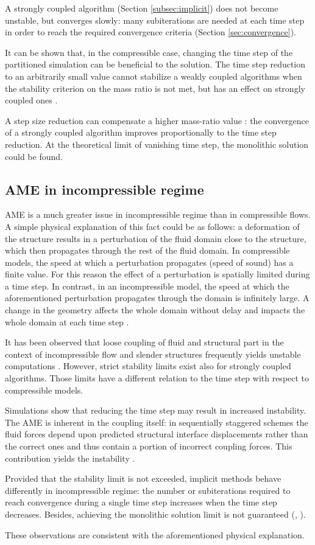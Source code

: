 A strongly coupled algorithm (Section \ref{subsec:implicit}) does not become unstable, but converges slowly: many subiterations are needed at each time step in order to reach the required convergence criteria (Section \ref{sec:convergence}).

It can be shown that, in the compressible case, changing the time step of the partitioned simulation can be beneficial to the solution. The time step reduction to an arbitrarily small value cannot stabilize a weakly coupled algorithms when the stability criterion on the mass ratio is not met, but has an effect on strongly coupled ones \cite{van2009added}.  

A step size reduction can compensate a higher mass-ratio value \cite{forster2006artificial}:
the convergence of a strongly coupled algorithm improves proportionally to the time step reduction. At the theoretical limit of vanishing time step, the monolithic solution could be found. 


\subsection{AME in incompressible regime}

AME is a much greater issue in incompressible regime than in compressible flows. A simple physical explanation of this fact could be as follows: a deformation of the structure results in a perturbation of the fluid domain close to the structure, which then propagates through the rest of the fluid domain. In compressible models, the speed at which a perturbation propagates (speed of sound) has a finite value. For this reason the effect of a perturbation is spatially limited during a time step. In contrast, in an incompressible model, the speed at which the aforementioned perturbation propagates through the domain is infinitely large. A change in the geometry affects the whole domain without delay and impacts the whole domain at each time step \cite{causin2005added}.

It has been observed that loose coupling of fluid and structural part in the context of incompressible flow and slender structures frequently yields unstable computations \cite{forster2006artificial}. However, strict stability limits exist also for strongly coupled algorithms. Those limits have a different relation to the time step with respect to compressible models.

Simulations show that reducing the time step may result in increased instability. The AME is inherent in the coupling itself: in sequentially staggered schemes the fluid forces depend upon predicted structural
interface displacements rather than the correct ones and thus contain a portion of incorrect coupling forces. This contribution yields the instability \cite{degroote2008stability}.

Provided that the stability limit is not exceeded, implicit methods behave differently in incompressible regime: the number or subiterations required to reach convergence during a single time step increases when the time step decreases. Besides, achieving the monolithic solution limit is not guaranteed (\cite{forster2006artificial}, \cite{van2009added}).

These observations are consistent with the aforementioned physical explanation.
